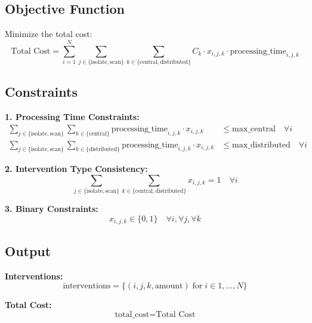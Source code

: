 \documentclass{article}
\begin{document}
\subsection*{Objective Function}
Minimize the total cost:
\[
\text{Total Cost} = \sum_{i=1}^{N} \sum_{j \in \{ \text{isolate}, \text{scan} \}} \sum_{k \in \{ \text{central}, \text{distributed} \}} C_k \cdot x_{i,j,k} \cdot \text{processing\_time}_{i,j,k}
\]

\subsection*{Constraints}

\textbf{1. Processing Time Constraints:}
\begin{align*}
\sum_{j \in \{ \text{isolate}, \text{scan} \}} \sum_{k \in \{ \text{central} \}} \text{processing\_time}_{i,j,k} \cdot x_{i,j,k} & \leq \text{max\_central} \quad \forall i \\
\sum_{j \in \{ \text{isolate}, \text{scan} \}} \sum_{k \in \{ \text{distributed} \}} \text{processing\_time}_{i,j,k} \cdot x_{i,j,k} & \leq \text{max\_distributed} \quad \forall i
\end{align*}

\textbf{2. Intervention Type Consistency:}
\[
\sum_{j \in \{ \text{isolate}, \text{scan} \}} \sum_{k \in \{ \text{central}, \text{distributed} \}} x_{i,j,k} = 1 \quad \forall i
\]

\textbf{3. Binary Constraints:}
\[
x_{i,j,k} \in \{0, 1\} \quad \forall i, \forall j, \forall k
\]

\subsection*{Output}
\textbf{Interventions:}
\[
\text{interventions} = \{ (i, j, k, \text{amount}) \; \text{for} \; i \in 1, \ldots, N \}
\]

\textbf{Total Cost:}
\[
\text{total\_cost} = \text{Total Cost}
\]
\end{document}
